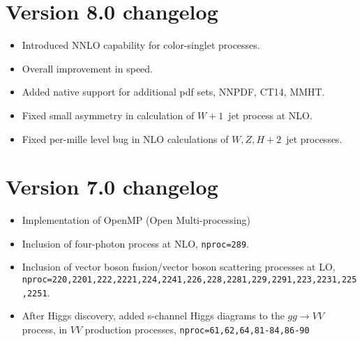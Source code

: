 \documentclass[12pt]{article}
\begin{document}
\section{Version 8.0 changelog}
\label{changelog8.0}
\begin{itemize}
\item Introduced NNLO capability for color-singlet processes.
\item Overall improvement in speed.
\item Added native support for additional pdf sets, NNPDF, CT14, MMHT.
\item Fixed small asymmetry in calculation of $W+1$~jet process at NLO.
\item Fixed per-mille level bug in NLO calculations of $W,Z,H+2$~jet processes.
\end{itemize}

\section{Version 7.0 changelog}
\label{changelog7.0}
\begin{itemize}
\item Implementation of OpenMP (Open Multi-processing)
\item Inclusion of four-photon process at NLO, {\tt nproc=289}.
\item Inclusion of vector boson fusion/vector boson scattering processes at LO,
 {\tt nproc=220,2201,222,2221,224,2241,226,228,2281,229,2291,223,2231,225,2251}.
\item After Higgs discovery, added s-channel Higgs diagrams to the $gg \to VV$ process,
in $VV$ production processes, {\tt nproc=61,62,64,81-84,86-90}
\end{itemize}
\end{document}
